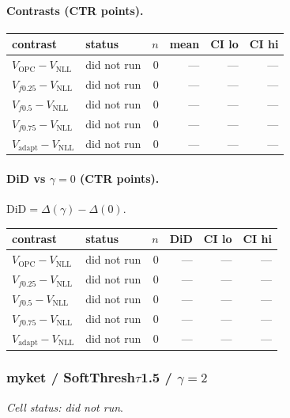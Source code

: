 \documentclass[10pt,a4paper]{article}
\begin{document}
\paragraph{Contrasts (CTR points).}
{\centering\small\begin{tabular}{llrrrr}
\toprule contrast & status & $n$ & mean & CI lo & CI hi \\
\midrule
$V_{\mathrm{OPC}}-V_{\mathrm{NLL}}$ & did not run & 0 & --- & --- & --- \\
$V_{f0.25}-V_{\mathrm{NLL}}$ & did not run & 0 & --- & --- & --- \\
$V_{f0.5}-V_{\mathrm{NLL}}$ & did not run & 0 & --- & --- & --- \\
$V_{f0.75}-V_{\mathrm{NLL}}$ & did not run & 0 & --- & --- & --- \\
$V_{\mathrm{adapt}}-V_{\mathrm{NLL}}$ & did not run & 0 & --- & --- & --- \\
\bottomrule\end{tabular}\par}
\paragraph{DiD vs $\gamma=0$ (CTR points).} $\mathrm{DiD}=\Delta(\gamma)-\Delta(0)$.
{\centering\small\begin{tabular}{llrrrr}
\toprule contrast & status & $n$ & DiD & CI lo & CI hi \\
\midrule
$V_{\mathrm{OPC}}-V_{\mathrm{NLL}}$ & did not run & 0 & --- & --- & --- \\
$V_{f0.25}-V_{\mathrm{NLL}}$ & did not run & 0 & --- & --- & --- \\
$V_{f0.5}-V_{\mathrm{NLL}}$ & did not run & 0 & --- & --- & --- \\
$V_{f0.75}-V_{\mathrm{NLL}}$ & did not run & 0 & --- & --- & --- \\
$V_{\mathrm{adapt}}-V_{\mathrm{NLL}}$ & did not run & 0 & --- & --- & --- \\
\bottomrule\end{tabular}\par}
\bigskip
\subsubsection{myket / SoftThresh$\tau$1.5 / $\gamma=2$}
\emph{Cell status: did not run}.
\end{document}
